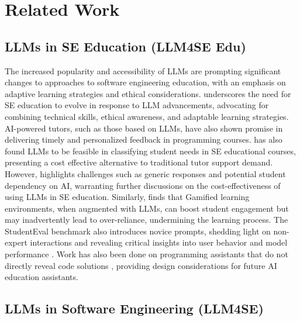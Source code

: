 

\section{Related Work}\label{sec-lit}

\subsection{LLMs in SE Education (LLM4SE Edu)}

The increased popularity and accessibility of LLMs are prompting significant changes to approaches to software engineering education, with an emphasis on adaptive learning strategies and ethical considerations. \cite{3626252.3630927} underscores the need for SE education to evolve in response to LLM advancements, advocating for combining technical skills, ethical awareness, and adaptable learning strategies.  
AI-powered tutors, such as those based on LLMs, have also shown promise in delivering timely and personalized feedback in programming courses.
\cite{savelka2023efficientclassificationstudenthelp} has also found LLMs to be feasible in classifying student needs in SE educational courses, presenting a cost effective alternative to traditional tutor support demand.
However, \cite{3639474.3640061} highlights challenges such as generic responses and potential student dependency on AI, warranting further discussions on the cost-effectiveness of using LLMs in SE education.  
Similarly, \cite{3661167.3661273} finds that Gamified learning environments, when augmented with LLMs, can boost student engagement but may inadvertently lead to over-reliance, undermining the learning process. 
The StudentEval benchmark also introduces novice prompts, shedding light on non-expert interactions and revealing critical insights into user behavior and model performance \cite{llm4code95}.
Work has also been done on programming assistants that do not directly reveal code solutions \cite{10.1145/3613904.3642773}, providing design considerations for future AI education assistants.


\subsection{LLMs in Software Engineering (LLM4SE)}

